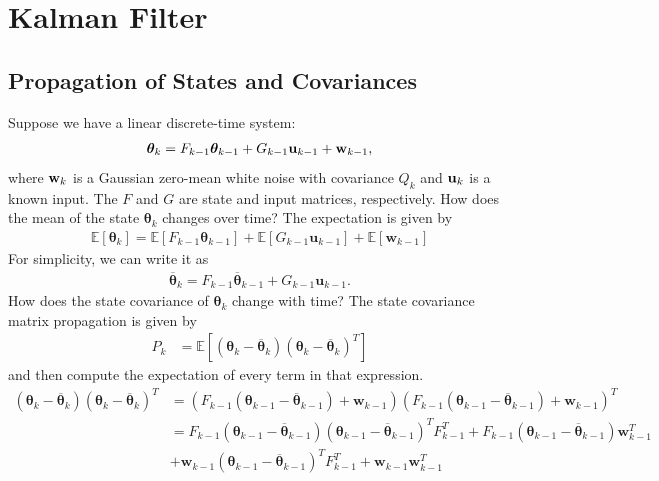 \chapter{Kalman Filter}
\label{sec:advanced_kalman}


\section{Propagation of States and Covariances}

Suppose we have a linear discrete-time system:
\begin{align*}
	\boldsymbol{\theta}_{k}=F_{k-1}\boldsymbol{\theta}_{k-1}+G_{k-1}\mathbf{u}_{k-1}+{\mathbf{w}}_{k-1},
\end{align*}
where ${\mathbf{w}}_k$ is a Gaussian zero-mean white noise with covariance $Q_k$ and ${\mathbf{u}}_k$ is a known input. The $F$ and $G$ are state and input matrices, respectively. How does the mean of the state $\boldsymbol{\theta}_k$ changes over time? The expectation is given by
\begin{align*}
	\mathbb{E}[\boldsymbol{\theta}_{k}]=\mathbb{E}[F_{k-1}\boldsymbol{\theta}_{k-1}]+\mathbb{E}[G_{k-1}\mathbf{u}_{k-1}]+\mathbb{E}[\mathbf{w}_{k-1}]
\end{align*}
For simplicity, we can write it as
\begin{align*}
	\overline{\boldsymbol{\theta}}_{k}=F_{k-1}\overline{\boldsymbol{\theta}}_{k-1}+G_{k-1}\mathbf{u}_{k-1}.
\end{align*}
How does the state covariance of $\boldsymbol{\theta}_k$ change with time? The state covariance matrix propagation is given by
\begin{align*}
	P_{k}&=\mathbb{E}[(\boldsymbol{\theta}_{k}-\overline{\boldsymbol{\theta}}_{k})(\boldsymbol{\theta}_{k}-\overline{\boldsymbol{\theta}}_{k})^{T}]
\end{align*}
and then compute the expectation of every term in that expression. 
\begin{align*}
	(\boldsymbol{\theta}_{k}-\overline{\boldsymbol{\theta}}_{k})(\boldsymbol{\theta}_{k}-\overline{\boldsymbol{\theta}}_{k})^{T} & = (F_{k-1}(\boldsymbol{\theta}_{k-1}-\overline{\boldsymbol{\theta}}_{k-1})+\mathbf{w}_{k-1})(F_{k-1}(\boldsymbol{\theta}_{k-1}-\overline{\boldsymbol{\theta}}_{k-1})+\mathbf{w}_{k-1})^{T}\\ 
																							 & = F_{k-1}(\boldsymbol{\theta}_{k-1}-\overline{\boldsymbol{\theta}}_{k-1})(\boldsymbol{\theta}_{k-1}-\overline{\boldsymbol{\theta}}_{k-1})^{T}F_{k-1}^{T}+F_{k-1}(\boldsymbol{\theta}_{k-1}-\overline{\boldsymbol{\theta}}_{k-1})\mathbf{w}_{k-1}^{T} \\ 
																							 & +\mathbf{w}_{k-1}(\boldsymbol{\theta}_{k-1}-\overline{\boldsymbol{\theta}}_{k-1})^{T}F_{k-1}^{T}+\mathbf{w}_{k-1}\mathbf{w}_{k-1}^{T}
\end{align*}

